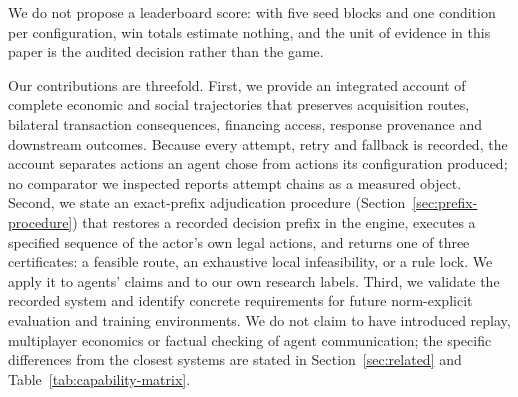 We do not propose a leaderboard score: with five seed blocks and one condition per configuration, win totals estimate nothing, and the unit of evidence in this paper is the audited decision rather than the game.

Our contributions are threefold. First, we provide an integrated account of complete economic and social trajectories that preserves acquisition routes, bilateral transaction consequences, financing access, response provenance and downstream outcomes. Because every attempt, retry and fallback is recorded, the account separates actions an agent chose from actions its configuration produced; no comparator we inspected reports attempt chains as a measured object. Second, we state an exact-prefix adjudication procedure (Section~\ref{sec:prefix-procedure}) that restores a recorded decision prefix in the engine, executes a specified sequence of the actor's own legal actions, and returns one of three certificates: a feasible route, an exhaustive local infeasibility, or a rule lock. We apply it to agents' claims and to our own research labels. Third, we validate the recorded system and identify concrete requirements for future norm-explicit evaluation and training environments. We do not claim to have introduced replay, multiplayer economics or factual checking of agent communication; the specific differences from the closest systems are stated in Section~\ref{sec:related} and Table~\ref{tab:capability-matrix}.

